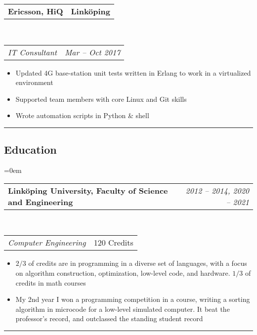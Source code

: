 \documentclass[10pt,letterpaper]{article}
\makeatletter
\newcommand{\headerrow}[2]
{\begin{tabular*}{\linewidth}{l@{\extracolsep{\fill}}r}
	#1 &
	#2 \\
\end{tabular*}}
\makeatother
\begin{document}
\headerrow
{\textbf{Ericsson, HiQ}}
{\textbf{Linköping}}
\\
\headerrow
{\emph{IT Consultant}}
{\emph{Mar -- Oct 2017}}
\begin{itemize}[noitemsep, topsep=0pt]
    \item Updated 4G base-station unit tests written in
        Erlang to work in a virtualized environment
    \item Supported team members with core Linux and Git skills
    \item Wrote automation scripts in Python \& shell
\end{itemize}
\vspace{0.5em}



\hrule
\vspace{-0.4em}
\subsection*{Education}
\parindent=0em

\headerrow
    {\textbf{Linköping University, Faculty of Science and Engineering}}
    {\emph{2012 -- 2014, 2020 -- 2021}}
\\
\headerrow
    {\emph{Computer Engineering}}
    {120 Credits}
\begin{itemize}[noitemsep, topsep=0pt]
    \item \( 2/3 \) of credits are in programming in a diverse set of
        languages, with a focus on algorithm construction, optimization,
        low-level code, and hardware. \( 1/3 \) of credits in math courses
    \item My 2nd year I won a programming competition in a course,
        writing a sorting algorithm in microcode for
        a low-level simulated computer. It beat the
        professor's record, and outclassed the standing student record
\end{itemize}
\vspace{0.5em}


\hrule
\vspace{-0.4em}
\end{document}
